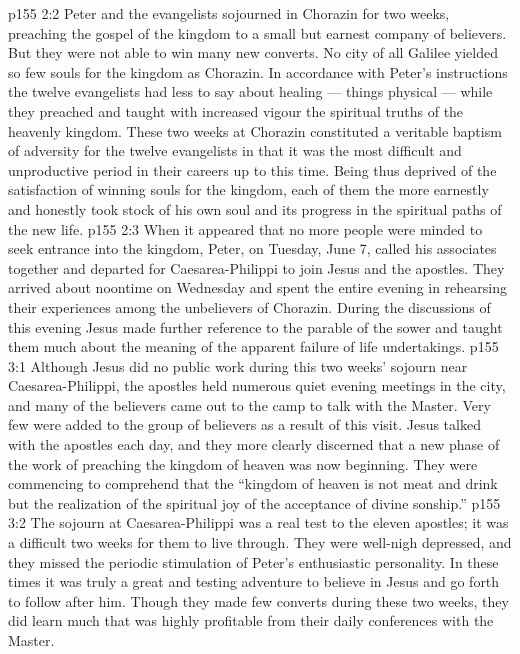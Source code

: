 \vs p155 2:2 Peter and the evangelists sojourned in Chorazin for two weeks, preaching the gospel of the kingdom to a small but earnest company of believers. But they were not able to win many new converts. No city of all Galilee yielded so few souls for the kingdom as Chorazin. In accordance with Peter’s instructions the twelve evangelists had less to say about healing --- things physical --- while they preached and taught with increased vigour the spiritual truths of the heavenly kingdom. These two weeks at Chorazin constituted a veritable baptism of adversity for the twelve evangelists in that it was the most difficult and unproductive period in their careers up to this time. Being thus deprived of the satisfaction of winning souls for the kingdom, each of them the more earnestly and honestly took stock of his own soul and its progress in the spiritual paths of the new life.
\vs p155 2:3 When it appeared that no more people were minded to seek entrance into the kingdom, Peter, on Tuesday, June 7, called his associates together and departed for Caesarea\hyp{}Philippi to join Jesus and the apostles. They arrived about noontime on Wednesday and spent the entire evening in rehearsing their experiences among the unbelievers of Chorazin. During the discussions of this evening Jesus made further reference to the parable of the sower and taught them much about the meaning of the apparent failure of life undertakings.
\vs p155 3:1 Although Jesus did no public work during this two weeks’ sojourn near Caesarea\hyp{}Philippi, the apostles held numerous quiet evening meetings in the city, and many of the believers came out to the camp to talk with the Master. Very few were added to the group of believers as a result of this visit. Jesus talked with the apostles each day, and they more clearly discerned that a new phase of the work of preaching the kingdom of heaven was now beginning. They were commencing to comprehend that the “kingdom of heaven is not meat and drink but the realization of the spiritual joy of the acceptance of divine sonship.”
\vs p155 3:2 The sojourn at Caesarea\hyp{}Philippi was a real test to the eleven apostles; it was a difficult two weeks for them to live through. They were well\hyp{}nigh depressed, and they missed the periodic stimulation of Peter’s enthusiastic personality. In these times it was truly a great and testing adventure to believe in Jesus and go forth to follow after him. Though they made few converts during these two weeks, they did learn much that was highly profitable from their daily conferences with the Master.
